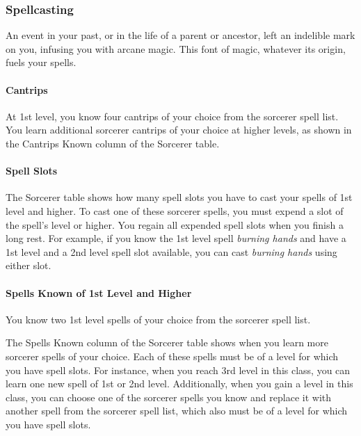 \documentclass[
]{article}
\begin{document}
\hypertarget{spellcasting}{%
\subsubsection{Spellcasting}\label{spellcasting}}

An event in your past, or in the life of a parent or ancestor, left an
indelible mark on you, infusing you with arcane magic. This font of
magic, whatever its origin, fuels your spells.

\hypertarget{cantrips}{%
\paragraph{Cantrips}\label{cantrips}}

At 1st level, you know four cantrips of your choice from the sorcerer
spell list. You learn additional sorcerer cantrips of your choice at
higher levels, as shown in the Cantrips Known column of the Sorcerer
table.

\hypertarget{spell-slots}{%
\paragraph{Spell Slots}\label{spell-slots}}

The Sorcerer table shows how many spell slots you have to cast your
spells of 1st level and higher. To cast one of these sorcerer spells,
you must expend a slot of the spell's level or higher. You regain all
expended spell slots when you finish a long rest. For example, if you
know the 1st level spell \emph{burning hands} and have a 1st level and a
2nd level spell slot available, you can cast \emph{burning hands} using
either slot.

\hypertarget{spells-known-of-1st-level-and-higher}{%
\paragraph{Spells Known of 1st Level and
Higher}\label{spells-known-of-1st-level-and-higher}}

You know two 1st level spells of your choice from the sorcerer spell
list.

The Spells Known column of the Sorcerer table shows when you learn more
sorcerer spells of your choice. Each of these spells must be of a level
for which you have spell slots. For instance, when you reach 3rd level
in this class, you can learn one new spell of 1st or 2nd level.
Additionally, when you gain a level in this class, you can choose one of
the sorcerer spells you know and replace it with another spell from the
sorcerer spell list, which also must be of a level for which you have
spell slots.
\end{document}
